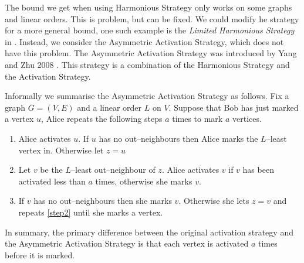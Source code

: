 
The bound we get when using Harmonious Strategy only works on some graphs and linear orders. This is problem, but can be fixed. We could modify he strategy for a more general bound, one such example is the \textit{Limited Harmonious Strategy} in \cite{kierYang2005}. Instead, we consider the Asymmetric Activation Strategy, which does not have this problem. The Asymmetric Activation Strategy was introduced by Yang and Zhu 2008 \cite{yangZhu2008}. This strategy is a combination of the Harmonious Strategy and the Activation Strategy.

Informally we summarise the Asymmetric Activation Strategy as follows. Fix a graph $G=(V,E)$ and a linear order $L$ on $V$. Suppose that Bob has just marked a vertex $u$, Alice repeats the following steps $a$ times to mark $a$ vertices.
\begin{enumerate}
    \item Alice activates $u$. If $u$ has no out--neighbours then Alice marks the $L$--least vertex in. Otherwise let $z=u$
    
    \item Let $v$ be the $L$--least out--neighbour of $z$. Alice activates $v$ if $v$ has been activated less than $a$ times, otherwise she marks $v$. \label{step2}
    
    \item If $v$ has no out--neighbours then she marks $v$. Otherwise she lets $z=v$ and repeats \ref{step2} until she marks a vertex.     
\end{enumerate}
In summary, the primary difference between the original activation strategy and the Asymmetric Activation Strategy is that each vertex is activated $a$ times before it is marked.


